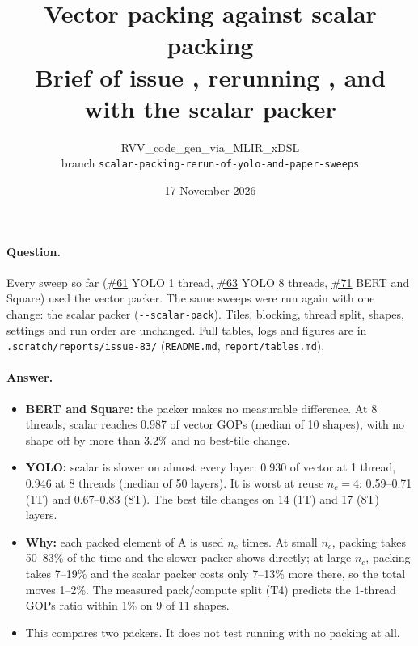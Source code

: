 \documentclass[10pt,a4paper]{article}
\title{\vspace{-1.2cm}\textbf{Vector packing against scalar packing}\\[2pt]
\large Brief of issue \iss{83}, rerunning \iss{61}, \iss{63} and \iss{71} with the scalar packer}
\author{RVV\_code\_gen\_via\_MLIR\_xDSL\\ \small branch \texttt{scalar-packing-rerun-of-yolo-and-paper-sweeps}}
\date{17 November 2026}
\newcommand{\iss}[1]{\href{https://github.com/JieGH/RVV_code_gen_via_MLIR_xDSL/issues/#1}{\##1}}
\begin{document}
\maketitle
\vspace{-0.8cm}

\paragraph{Question.} Every sweep so far (\iss{61} YOLO 1 thread, \iss{63} YOLO 8 threads, \iss{71} BERT and Square)
used the vector packer. The same sweeps were run again with one change: the scalar packer (\texttt{-{}-scalar-pack}).
Tiles, blocking, thread split, shapes, settings and run order are unchanged.
Full tables, logs and figures are in\\ \texttt{.scratch/reports/issue-83/} (\texttt{README.md}, \texttt{report/tables.md}).

\paragraph{Answer.}
\begin{itemize}
  \item \textbf{BERT and Square:} the packer makes no measurable difference. At 8 threads, scalar reaches 0.987 of
        vector GOPs (median of 10 shapes), with no shape off by more than 3.2\% and no best-tile change.
  \item \textbf{YOLO:} scalar is slower on almost every layer: 0.930 of vector at 1 thread, 0.946 at 8 threads
        (median of 50 layers). It is worst at reuse $n_c=4$: 0.59--0.71 (1T) and 0.67--0.83 (8T). The best tile
        changes on 14 (1T) and 17 (8T) layers.
  \item \textbf{Why:} each packed element of A is used $n_c$ times. At small $n_c$, packing takes 50--83\% of the time and
        the slower packer shows directly; at large $n_c$, packing takes 7--19\% and the scalar packer costs only
        7--13\% more there, so the total moves 1--2\%. The measured pack/compute split (T4) predicts the 1-thread
        GOPs ratio within 1\% on 9 of 11 shapes.
  \item This compares two packers. It does not test running with no packing at all.
\end{itemize}
\end{document}
